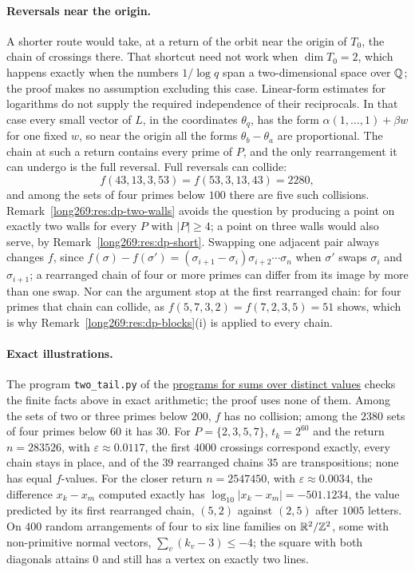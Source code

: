 \documentclass[11pt]{article}
\theoremstyle{remark}
\theoremstyle{plain}
\newcommand{\distinctheighturl}{https://github.com/wcook04/plectis-erdos/tree/10178c4df40cb27d83b5ebb1ec337dd588b82998/research/experiments/erdos269/distinct_height}
\begin{document}
\paragraph{Reversals near the origin.}  A shorter route would take, at a
return of the orbit near the origin of $T_0$, the chain of crossings there.
That shortcut need not work when $\dim T_0=2$, which happens exactly when the numbers
$1/\log q$ span a two-dimensional space over $\mathbb{Q}$; the proof makes no assumption excluding this case. Linear-form estimates for logarithms do not supply the required independence of their reciprocals.  In that case every small vector of $L$, in the coordinates
$\theta_q$, has the form $\alpha(1,\ldots,1)+\beta w$ for one fixed $w$, so
near the origin all the forms $\theta_b-\theta_a$ are proportional.  The
chain at such a return contains every prime of $P$, and the only
rearrangement it can undergo is the full reversal.  Full reversals can
collide:
\[
 f(43,13,3,53)=f(53,3,13,43)=2280,
\]
and among the sets of four primes below $100$ there are five such
collisions.  Remark~\ref{long269:res:dp-two-walls} avoids the question by
producing a point on exactly two walls for every $P$ with $|P|\ge4$; a point
on three walls would also serve, by Remark~\ref{long269:res:dp-short}.
Swapping one adjacent pair always changes $f$, since
$f(\sigma)-f(\sigma')=(\sigma_{i+1}-\sigma_i)\sigma_{i+2}\cdots\sigma_n$
when $\sigma'$ swaps $\sigma_i$ and $\sigma_{i+1}$; a rearranged chain of
four or more primes can differ from its image by more than one swap.  Nor can the argument stop at
the first rearranged chain: for four primes that chain can collide, as
$f(5,7,3,2)=f(7,2,3,5)=51$ shows, which is why
Remark~\ref{long269:res:dp-blocks}(i) is applied to every chain.

\paragraph{Exact illustrations.}  The program \texttt{two\_tail.py} of the
\href{\distinctheighturl}{programs for sums over distinct values} checks the finite facts
above in exact arithmetic; the proof uses none of them.  Among the sets of
two or three primes below $200$, $f$ has no collision; among the $2380$
sets of four primes below $60$ it has $30$.  For $P=\{2,3,5,7\}$,
$t_k=2^{60}$ and the return $n=283526$, with $\varepsilon\approx0.0117$,
the first $4000$ crossings correspond exactly, every chain stays in place,
and of the $39$ rearranged chains $35$ are transpositions; none has equal
$f$-values.  For the closer return $n=2547450$, with
$\varepsilon\approx0.0034$, the difference $x_k-x_m$ computed exactly has
$\log_{10}|x_k-x_m|=-501.1234$, the value predicted by its first
rearranged chain, $(5,2)$ against $(2,5)$ after $1005$ letters.  On $400$
random arrangements of four to six line families on $\mathbb{R}^2/\mathbb{Z}^2$, some with
non-primitive normal vectors, $\sum_v(k_v-3)\le-4$; the square with both
diagonals attains $0$ and still has a vertex on exactly two lines.
\end{document}

